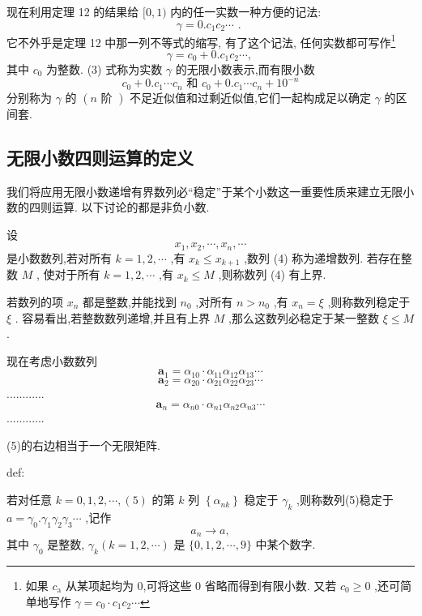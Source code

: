 现在利用定理 12 的结果给 \(\lbrack 0,1)\) 内的任一实数一种方便的记法:
\[
\gamma  = 0.{c}_{1}{c}_{2}\cdots \text{ . }
\]
它不外乎是定理 12 中那一列不等式的缩写, 有了这个记法, 任何实数都可写作\footnote{如果 \({c}_{\mathrm{a}}\) 从某项起均为 0,可将这些 0 省略而得到有限小数. 又若 \({c}_{0} \geq  0\) ,还可简单地写作 \(\gamma  = {c}_{0} \cdot  {c}_{1}{c}_{2}\cdots\)}
\[
\gamma  = {c}_{0} + 0.{c}_{1}{c}_{2}\cdots \text{, } \tag{3}
\]
其中 \({c}_{0}\) 为整数. (3) 式称为实数 \(\gamma\) 的无限小数表示,而有限小数
\[
{c}_{0} + 0.{c}_{1}\cdots {c}_{n}\text{ 和 }{c}_{0} + 0.{c}_{1}\cdots {c}_{n} + {10}^{-n}
\]
分别称为 \(\gamma\) 的 \(\left( {n\text{ 阶 }}\right)\) 不足近似值和过剩近似值,它们一起构成足以确定 \(\gamma\) 的区间套.

\subsection{无限小数四则运算的定义}

我们将应用无限小数递增有界数列必“稳定”于某个小数这一重要性质来建立无限小数的四则运算. 以下讨论的都是非负小数.

设
\[
{x}_{1},{x}_{2},\cdots ,{x}_{n},\cdots  \tag{4}
\]
是小数数列,若对所有 \(k = 1,2,\cdots\) ,有 \({x}_{k} \leq  {x}_{k + 1}\) ,数列 (4) 称为递增数列. 若存在整数 \(M\) , 使对于所有 \(k = 1,2,\cdots\) ,有 \({x}_{k} \leq  M\) ,则称数列 (4) 有上界.



若数列的项 \({x}_{n}\) 都是整数,并能找到 \({n}_{0}\) ,对所有 \(n > {n}_{0}\) ,有 \({x}_{n} = \xi\) ,则称数列稳定于 \(\xi\) . 容易看出,若整数数列递增,并且有上界 \(M\) ,那么这数列必稳定于某一整数 \(\xi  \leq  M\) .

现在考虑小数数列
\[
{\mathbf{a}}_{1} = {\alpha }_{10} \cdot  {\alpha }_{11}{\alpha }_{12}{\alpha }_{13}\cdots
\]
\[
{\mathbf{a}}_{2} = {\alpha }_{20} \cdot  {\alpha }_{21}{\alpha }_{22}{\alpha }_{23}\cdots  \tag{5}
\]
............
\[
{\mathbf{a}}_{n} = {\alpha }_{n0} \cdot  {\alpha }_{n1}{\alpha }_{n2}{\alpha }_{n3}\cdots
\]
............

(5)的右边相当于一个无限矩阵.

\begin{definition}{}{def:}

\end{definition}
若对任意 \(k = 0,1,2,\cdots ,\left( 5\right)\) 的第 \(k\) 列 \(\left\{  {\alpha }_{nk}\right\}\) 稳定于 \({\gamma }_{k}\) ,则称数列(5)稳定于 \(a = {\gamma }_{0}.{\gamma }_{1}{\gamma }_{2}{\gamma }_{3}\cdots\) ,记作
\[
{a}_{n} \rightarrow  a, \tag{6}
\]
其中 \({\gamma }_{0}\) 是整数, \({\gamma }_{k}\left( {k = 1,2,\cdots }\right)\) 是 \(\{ 0,1,2,\cdots ,9\}\) 中某个数字.

